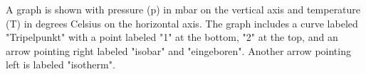 A graph is shown with pressure (p) in mbar on the vertical axis and temperature (T) in degrees Celsius on the horizontal axis. The graph includes a curve labeled "Tripelpunkt" with a point labeled "1" at the bottom, "2" at the top, and an arrow pointing right labeled "isobar" and "eingeboren". Another arrow pointing left is labeled "isotherm".